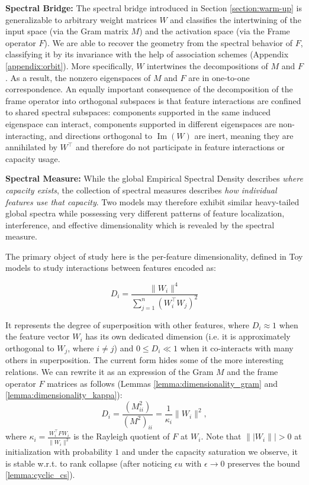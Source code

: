 \documentclass{article}
\newcommand{\narmeen}[1]{\textcolor{red}{(Narmeen: #1)}}
\theoremstyle{plain}
\numberwithin{equation}{section}
\theoremstyle{definition}
\theoremstyle{remark}
\begin{document}
\textbf{Spectral Bridge: }
The spectral bridge introduced in Section \ref{section:warm-up} is generalizable to arbitrary weight matrices $W$ and classifies the intertwining of the input space (via the Gram matrix $M$) and the activation space (via the Frame operator $F$). We are able to recover the geometry from the spectral behavior of $F$, classifying it by its invariance with the help of association schemes (Appendix \ref{appendix:orbit}). More specifically, $W$ intertwines the decompositions of $M$ and $F$. As a result, the nonzero eigenspaces of $M$ and $F$ are in one-to-one correspondence. An  equally important consequence of the decomposition of the frame operator into orthogonal subspaces is that feature interactions are confined to shared spectral subspaces: components supported in the same induced eigenspace can interact, components supported in different eigenspaces are non-interacting, and directions orthogonal to $\operatorname{Im}(W)$ are inert, meaning they are annihilated by $W^\top$ and therefore do not participate in feature interactions or capacity usage.
 
\textbf{Spectral Measure: } While the global Empirical Spectral Density \citep{htsr1} describes \emph{where capacity exists}, the collection of spectral measures describes \emph{how individual features use that capacity}. Two models may therefore exhibit similar heavy-tailed global spectra while possessing very different patterns of feature localization, interference, and effective dimensionality which is revealed by the spectral measure.

The primary object of study here is the per-feature dimensionality, defined in Toy models \cite{toymodels} to study interactions between features encoded as:

\begin{equation}D_i=\frac{\|W_i\|^4}{\sum_{j=1}^n\left({W}_i^\top{W}_j\right)^2}\end{equation}

It represents the degree of superposition with other features, where $D_i\approx 1$ when the feature vector $W_i$ has its own dedicated dimension (i.e. it is approximately orthogonal to $W_j$, where $i\neq j$) and $0\leq D_i\ll 1$ when it co-interacts with many others in superposition.  The current form hides some of the more interesting relations. We can rewrite it as an expression of the Gram $M$ and the frame operator $F$ matrices as follows (Lemmas \ref{lemma:dimensionality_gram} and \ref{lemma:dimensionality_kappa}):
\begin{equation}D_i = \frac{(M_{ii}^2)}{(M^2)_{ii}} = \frac{1}{\kappa_i} \|W_i\|^2,\end{equation}\label{eq:3.2}
where $\kappa_i = \frac{W_i^\top F W_i}{\|W_i\|^2}$ is the Rayleigh quotient of $F$ at $W_i$. Note that $\||W_i\||>0$ at initialization with probability $1$ and under the capacity saturation we observe, it is stable w.r.t. to rank collapse (after noticing $\epsilon u$ with $\epsilon\rightarrow 0$ preserves the bound \ref{lemma:cyclic_cs}). 
\end{document}
